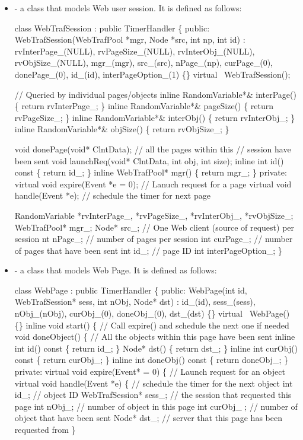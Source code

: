 \begin{itemize}
\item {} - a class that models Web user session. It is defined as follows:
\begin{program}
class WebTrafSession : public TimerHandler \{
	public:   
	        WebTrafSession(WebTrafPool *mgr, Node *src, int np, int id) : rvInterPage_(NULL),
	        rvPageSize_(NULL), rvInterObj_(NULL), rvObjSize_(NULL), mgr_(mgr), src_(src), 
	        nPage_(np), curPage_(0), donePage_(0), id_(id), interPageOption_(1) \{\} 
	        virtual ~WebTrafSession();

	        // Queried by individual pages/objects
	        inline RandomVariable*& interPage() \{ return rvInterPage_; \}
	        inline RandomVariable*& pageSize() \{ return rvPageSize_; \}
	        inline RandomVariable*& interObj() \{ return rvInterObj_; \}
	        inline RandomVariable*& objSize() \{ return rvObjSize_; \}
		
	        void donePage(void* ClntData); // all the pages within this
	                                       // session have  been sent
	        void launchReq(void* ClntData, int obj, int size);
	        inline int id() const \{ return id_; \}
	        inline WebTrafPool* mgr() \{ return mgr_; \}
	 private:
	        virtual void expire(Event *e = 0); // Lanuch request for a page
	        virtual void handle(Event *e); // schedule the timer for next page

	        RandomVariable *rvInterPage_, *rvPageSize_, *rvInterObj_, *rvObjSize_;
	        WebTrafPool* mgr_;
	        Node* src_;  // One Web client (source of request) per session
	        nt nPage_; // number of pages per session
	        int curPage_; // number of pages that have been sent
	        int id_; // page ID
	        int interPageOption_;
\}
\end{program}
\item {} - a class that models Web Page. It is defined as follows:
\begin{program}
class WebPage : public TimerHandler \{
	public:
	        WebPage(int id, WebTrafSession* sess, int nObj, Node* dst) :
	                id_(id), sess_(sess), nObj_(nObj), curObj_(0),
	                doneObj_(0), dst_(dst) \{\}
	        virtual ~WebPage() \{\}
	        inline void start() \{ // Call expire() and schedule the next one if needed     
	        void doneObject() \{ // All the objects within this page have been sent
	        inline int id() const \{ return id_; \}
	        Node* dst() \{ return dst_; \}
	        inline int curObj() const \{ return curObj_; \}
	        inline int doneObj() const \{ return doneObj_; \}
	private:  
	        virtual void expire(Event* = 0) \{ // Launch request for an object
	        virtual void handle(Event *e) \{ // schedule the timer for the next object
	        int id_; // object ID
	        WebTrafSession* sess_; // the session that requested this page
	        int nObj_; // number of object in this page
	        int curObj_ ; // number of object that have been sent
	        Node* dst_; //  server that this page has been requested from
\}
\end{program}
\end{itemize}


